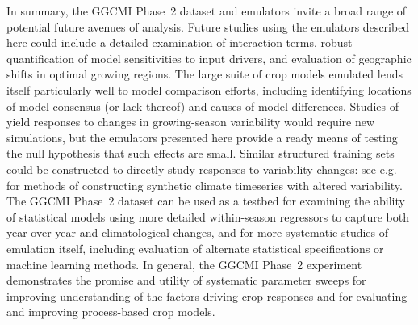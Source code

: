 \documentclass[gmdd]{copernicus} %
\begin{document}
In summary, the GGCMI Phase~2 dataset and emulators invite a broad range of potential future avenues of analysis.
Future studies using the emulators described here could include a detailed examination of interaction terms, robust quantification of model sensitivities to input drivers, and evaluation of geographic shifts in optimal growing regions. 
The large suite of crop models emulated lends itself particularly well to model comparison efforts, including identifying locations of model consensus (or lack thereof) and causes of model differences.
Studies of yield responses to changes in growing-season variability would require new simulations, but the emulators presented here provide a ready means of testing the null hypothesis that such effects are small.
Similar structured training sets could be constructed to directly study responses to variability changes: see e.g.\ \citet{poppick2016, Haugen2018} for methods of constructing synthetic climate timeseries with altered variability. 
The GGCMI Phase~2 dataset can be used as a testbed for examining the ability of statistical models using more detailed within-season regressors to capture both year-over-year and climatological changes, and for more systematic studies of emulation itself, including evaluation of alternate statistical specifications or machine learning methods.
In general, the GGCMI Phase~2 experiment demonstrates the promise and utility of systematic parameter sweeps for improving understanding of the factors driving crop responses and for evaluating and improving process-based crop models.


\end{document}
